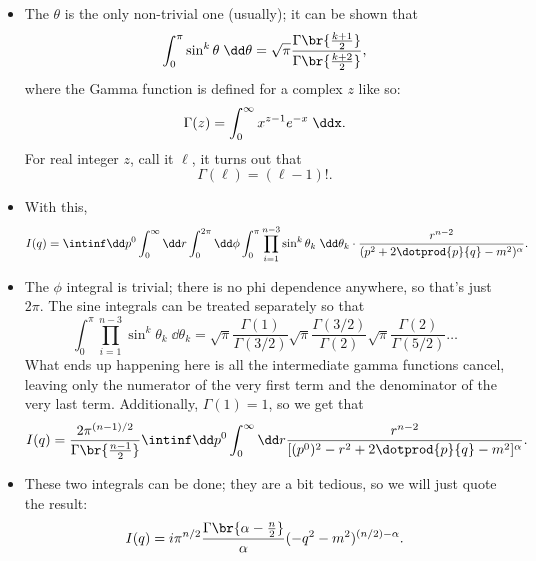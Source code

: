 \begin{itemize}
    \item The $\theta$ is the only non-trivial one (usually); it can be shown that
        \begin{equation}
            \int_0^{\pi} \sin^k\theta \;\dd\theta = \sqrt{\pi} \frac{\Gamma\br{\frac{k+1}{2}}}{\Gamma\br{\frac{k+2}{2}}},
        \end{equation}
        where the Gamma function is defined for a complex $z$ like so:
        \begin{equation}
            \Gamma(z) = \int_0^{\infty} x^{z-1} e^{-x} \;\ddx.
        \end{equation}
        For real integer $z$, call it $\ell$, it turns out that
        \begin{equation}
            \Gamma(\ell) = (\ell - 1)!.
        \end{equation}
    \item With this,
        \begin{equation*}
            I(q) = \intinf \dd p^0 \int_0^{\infty} \dd r \int_0^{2\pi} \dd\phi \int_0^{\pi} \prod_{i=1}^{n-3}\sin^k\theta_k \;\dd\theta_k \cdot \frac{r^{n-2}}{(p^2 + 2\dotprod{p}{q} - m^2)^{\alpha}}.
        \end{equation*}
    \item The $\phi$ integral is trivial; there is no phi dependence anywhere, so that's just $2\pi$. The sine integrals can be treated separately so that
        \begin{equation*}
            \int_0^{\pi} \prod_{i=1}^{n-3}\sin^k\theta_k \;\dd\theta_k = \sqrt{\pi} \frac{\Gamma(1)}{\Gamma(3/2)} \sqrt{\pi} \frac{\Gamma(3/2)}{\Gamma(2)}\sqrt{\pi} \frac{\Gamma(2)}{\Gamma(5/2)}\ldots
        \end{equation*}
        What ends up happening here is all the intermediate gamma functions cancel, leaving only the numerator of the very first term and the denominator of the very last term. Additionally, $\Gamma(1) = 1$, so we get that
        \begin{equation*}
            I(q) = \frac{2\pi^{(n-1)/2}}{\Gamma\br{\frac{n-1}{2}}} \intinf \dd p^0 \int_0^{\infty} \dd r \frac{r^{n-2}}{[(p^0)^2 - r^2 + 2\dotprod{p}{q} - m^2]^{\alpha}}.
        \end{equation*}
    \item These two integrals can be done; they are a bit tedious, so we will just quote the result:
        \begin{equation}
            I(q) = i\pi^{n/2} \frac{\Gamma\br{\alpha - \frac{n}{2}}}{\alpha} (-q^2 - m^2)^{(n/2) - \alpha}.

\end{equation}
\end{itemize}

